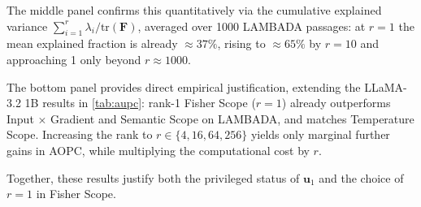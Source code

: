 \documentclass{article}
\begin{document}
The middle panel confirms this quantitatively via the cumulative explained variance $\sum_{i=1}^r \lambda_i / \mathrm{tr}(\bm{F})$, averaged over 1000 LAMBADA passages: 
at $r=1$ the mean explained fraction is already $\approx 37\%$, rising to $\approx 65\%$ by $r=10$ and approaching 1 only beyond $r \approx 1000$.

The bottom panel provides direct empirical justification, extending the LLaMA-3.2 1B results in \cref{tab:aupc}: rank-1 Fisher Scope ($r=1$) already outperforms Input $\times$ Gradient and Semantic Scope on LAMBADA, and matches Temperature Scope.
Increasing the rank to $r \in \{4, 16, 64, 256\}$ yields only marginal further gains in AOPC, while multiplying the computational cost by $r$.

Together, these results justify both the privileged status of $\bm{u}_1$ and the choice of $r=1$ in Fisher Scope.


\clearpage

\end{document}
